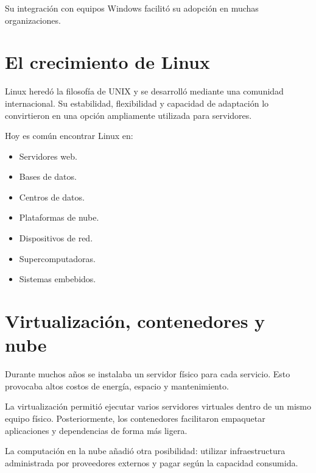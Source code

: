 \documentclass[
  spanish,
  letterpaper,
]{scrbook}
\providecommand{\tightlist}{%
  \setlength{\itemsep}{0pt}\setlength{\parskip}{0pt}}
\begin{document}
Su integración con equipos Windows facilitó su adopción en muchas
organizaciones.

\section{El crecimiento de Linux}\label{el-crecimiento-de-linux}

Linux heredó la filosofía de UNIX y se desarrolló mediante una comunidad
internacional. Su estabilidad, flexibilidad y capacidad de adaptación lo
convirtieron en una opción ampliamente utilizada para servidores.

Hoy es común encontrar Linux en:

\begin{itemize}
\tightlist
\item
  Servidores web.
\item
  Bases de datos.
\item
  Centros de datos.
\item
  Plataformas de nube.
\item
  Dispositivos de red.
\item
  Supercomputadoras.
\item
  Sistemas embebidos.
\end{itemize}

\section{Virtualización, contenedores y
nube}\label{virtualizaciuxf3n-contenedores-y-nube}

Durante muchos años se instalaba un servidor físico para cada servicio.
Esto provocaba altos costos de energía, espacio y mantenimiento.

La virtualización permitió ejecutar varios servidores virtuales dentro
de un mismo equipo físico. Posteriormente, los contenedores facilitaron
empaquetar aplicaciones y dependencias de forma más ligera.

La computación en la nube añadió otra posibilidad: utilizar
infraestructura administrada por proveedores externos y pagar según la
capacidad consumida.
\end{document}
